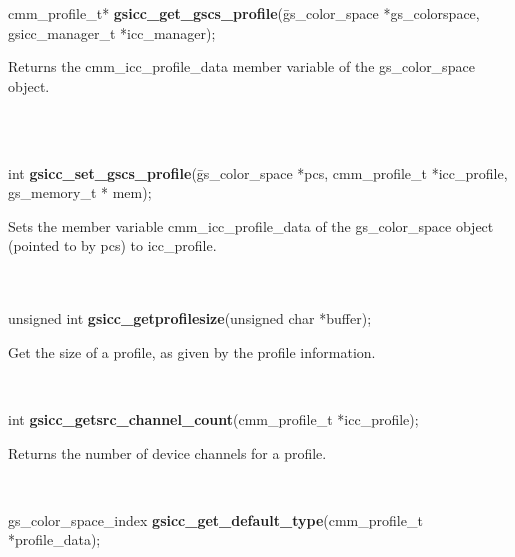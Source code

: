 \documentclass[12pt,notitlepage]{article}
\begin{document}
\begin{tabbing}
\noindent cmm\_profile\_t* {\bf gsicc\_get\_gscs\_profile}(\=gs\_color\_space *gs\_colorspace, \\
\> gsicc\_manager\_t *icc\_manager);\\
\end{tabbing}

\begin{minipage}[h]{6.0in}
Returns the cmm\_icc\_profile\_data member variable of the gs\_color\_space object.
\end{minipage}\\
\\

\begin{tabbing}
\noindent int {\bf gsicc\_set\_gscs\_profile}(\=gs\_color\_space *pcs, cmm\_profile\_t *icc\_profile, \\
\> gs\_memory\_t * mem);\\
\end{tabbing}

\begin{minipage}[h]{6.0in}
Sets the member variable cmm\_icc\_profile\_data of the gs\_color\_space object (pointed to by pcs) to icc\_profile.
\end{minipage}\\
\\

\noindent unsigned int {\bf gsicc\_getprofilesize}(unsigned char *buffer);\\

\begin{minipage}[h]{6.0in}
Get the size of a profile, as given by the profile information.
\end{minipage}\\

\begin{tabbing}
\noindent int {\bf gsicc\_getsrc\_channel\_count}(cmm\_profile\_t *icc\_profile);\\
\end{tabbing}

\begin{minipage}[h]{6.0in}
Returns the number of device channels for a profile.
\end{minipage}\\

\begin{tabbing}
\noindent gs\_color\_space\_index {\bf gsicc\_get\_default\_type}(cmm\_profile\_t *profile\_data);\\
\end{tabbing}
\end{document}
